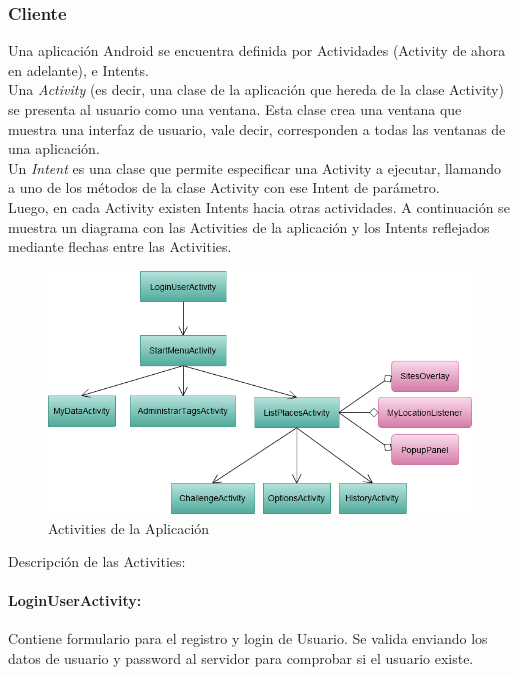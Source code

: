 \documentclass[10pt,letterpaper]{article}
\begin{document}
\subsubsection{Cliente}

Una aplicación Android se encuentra definida por Actividades (Activity de ahora en adelante), e Intents.\\

Una \textit{Activity} (es decir, una clase de la aplicación que hereda de la clase Activity) se presenta al usuario como una ventana. Esta clase crea una ventana que muestra una interfaz de usuario, vale decir, corresponden a todas las ventanas de una aplicación. \\

Un \textit{Intent} es una clase que permite especificar una Activity a ejecutar, llamando a uno de los métodos de la clase Activity con ese Intent de parámetro.\\

Luego, en cada Activity existen Intents hacia otras actividades. A continuación se muestra un diagrama con las Activities de la aplicación y los Intents reflejados mediante flechas entre las Activities.\\

\begin{figure}[h]
\begin{center}
\includegraphics[width=400pt]{./imgs/TripdroidActivities.png}
\caption{Activities de la Aplicación}
\end{center}
\end{figure}

\newpage
Descripción de las Activities:\\

\paragraph{LoginUserActivity:} Contiene formulario para el registro y login de Usuario. Se valida enviando los datos de usuario y password al servidor para comprobar si el usuario existe.
\end{document}
